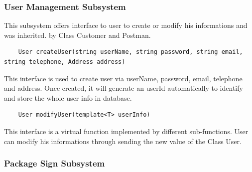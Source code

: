 \documentclass[12pt]{scrreprt}
\begin{document}
\subsubsection{User Management Subsystem}
This subsystem offers interface to user to create or modify his informations and was inherited. by Class Customer and Postman.
\begin{lstlisting}
	User createUser(string userName, string password, string email, string telephone, Address address)
\end{lstlisting}
This interface is used to create user via userName, password, email, telephone and address. Once created, it will generate an userId automatically to identify and store the whole user info in database.
\begin{lstlisting}
	User modifyUser(template<T> userInfo)
\end{lstlisting}
This interface is a virtual function implemented by different sub-functions. User can modify his informations through sending the new value of the Class User.

\subsubsection{Package Sign Subsystem}
\end{document}
